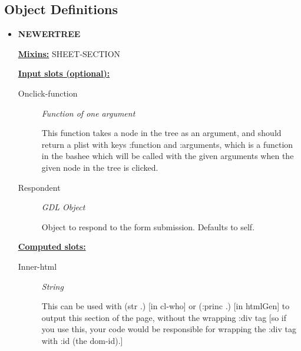 \documentclass [11pt]{book}
\begin{document}
\subsection{Object Definitions}

\label{subsec:objectdefinitions}



\begin{itemize}

\item {}
\textbf{NEWERTREE}


\textbf{
\underline{Mixins:}} SHEET-SECTION





\begin{description}

\end{description}








\textbf{
\underline{Input slots (optional):}}

\begin{description}

\item [Onclick-function]
\emph{Function of one argument}

 This function takes a node in the tree as an argument, and should return
a plist with keys :function and :arguments, which is a function in the bashee which will be called
with the given arguments when the given node in the tree is clicked.




\item [Respondent]
\emph{GDL Object}

 Object to respond to the form submission. Defaults to self.




\end{description}






\textbf{
\underline{Computed slots:}}

\begin{description}

\item [Inner-html]
\emph{String}

 This can be used with (str .) [in cl-who] or (:princ .) [in htmlGen]
to output this section of the page, without the wrapping :div tag [so if you use this,
your code would be responsible for wrapping the :div tag with :id (the dom-id).]





\end{description}
\end{itemize}
\end{document}

